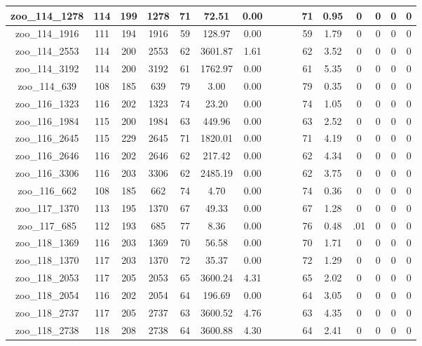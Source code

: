 \begin{landscape}
\begin{longtable}{|c|c|c|c|c|c|c|c|c|c|c|c|c|c|c|c|}
zoo\_114\_1278 & 114 & 199 & 1278 & 71 & 72.51 & 0.00 &  &  &  & 71 & 0.95 & 0 & 0 & 0 & 0 \\ \hline 
zoo\_114\_1916 & 111 & 194 & 1916 & 59 & 128.97 & 0.00 &  &  &  & 59 & 1.79 & 0 & 0 & 0 & 0 \\ \hline 
zoo\_114\_2553 & 114 & 200 & 2553 & 62 & 3601.87 & 1.61 &  &  &  & 62 & 3.52 & 0 & 0 & 0 & 0 \\ \hline 
zoo\_114\_3192 & 114 & 200 & 3192 & 61 & 1762.97 & 0.00 &  &  &  & 61 & 5.35 & 0 & 0 & 0 & 0 \\ \hline 
zoo\_114\_639 & 108 & 185 & 639 & 79 & 3.00 & 0.00 &  &  &  & 79 & 0.35 & 0 & 0 & 0 & 0 \\ \hline 
zoo\_116\_1323 & 116 & 202 & 1323 & 74 & 23.20 & 0.00 &  &  &  & 74 & 1.05 & 0 & 0 & 0 & 0 \\ \hline 
zoo\_116\_1984 & 115 & 200 & 1984 & 63 & 449.96 & 0.00 &  &  &  & 63 & 2.52 & 0 & 0 & 0 & 0 \\ \hline 
zoo\_116\_2645 & 115 & 229 & 2645 & 71 & 1820.01 & 0.00 &  &  &  & 71 & 4.19 & 0 & 0 & 0 & 0 \\ \hline 
zoo\_116\_2646 & 116 & 202 & 2646 & 62 & 217.42 & 0.00 &  &  &  & 62 & 4.34 & 0 & 0 & 0 & 0 \\ \hline 
zoo\_116\_3306 & 116 & 203 & 3306 & 62 & 2485.19 & 0.00 &  &  &  & 62 & 3.75 & 0 & 0 & 0 & 0 \\ \hline 
zoo\_116\_662 & 108 & 185 & 662 & 74 & 4.70 & 0.00 &  &  &  & 74 & 0.36 & 0 & 0 & 0 & 0 \\ \hline 
zoo\_117\_1370 & 113 & 195 & 1370 & 67 & 49.33 & 0.00 &  &  &  & 67 & 1.28 & 0 & 0 & 0 & 0 \\ \hline 
zoo\_117\_685 & 112 & 193 & 685 & 77 & 8.36 & 0.00 &  &  &  & 76 & 0.48 & .01 & 0 & 0 & 0 \\ \hline 
zoo\_118\_1369 & 116 & 203 & 1369 & 70 & 56.58 & 0.00 &  &  &  & 70 & 1.71 & 0 & 0 & 0 & 0 \\ \hline 
zoo\_118\_1370 & 117 & 203 & 1370 & 72 & 35.37 & 0.00 &  &  &  & 72 & 1.29 & 0 & 0 & 0 & 0 \\ \hline 
zoo\_118\_2053 & 117 & 205 & 2053 & 65 & 3600.24 & 4.31 &  &  &  & 65 & 2.02 & 0 & 0 & 0 & 0 \\ \hline 
zoo\_118\_2054 & 116 & 202 & 2054 & 64 & 196.69 & 0.00 &  &  &  & 64 & 3.05 & 0 & 0 & 0 & 0 \\ \hline 
zoo\_118\_2737 & 117 & 205 & 2737 & 63 & 3600.52 & 4.76 &  &  &  & 63 & 4.35 & 0 & 0 & 0 & 0 \\ \hline 
zoo\_118\_2738 & 118 & 208 & 2738 & 64 & 3600.88 & 4.30 &  &  &  & 64 & 2.41 & 0 & 0 & 0 & 0 \\ \hline 

\end{longtable}
\end{landscape}
